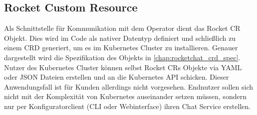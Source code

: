 \subsection{Rocket Custom Resource}
Als Schnittstelle für Kommunikation mit dem Operator dient das Rocket \ac{CR} Objekt.
Dies wird im Code als nativer Datentyp definiert und schließlich zu einem \ac{CRD} generiert, um es im Kubernetes Cluster zu installieren.
Genauer dargestellt wird die Spezifikation des Objekts in \ref{chap:rocketchat_crd_spec}.
Nutzer des Kubernetes Cluster können selbst Rocket \acp{CR} Objekte via YAML oder JSON Dateien erstellen und
an die Kubernetes API schicken. Dieser Anwendungsfall ist für Kunden allerdings nicht vorgesehen.
Endnutzer sollen sich nicht mit der Komplexität von Kubernetes auseinander setzen müssen,
sondern nur per Konfiguratorclient (\ac{CLI} oder Webinterface) ihren Chat Service erstellen.


